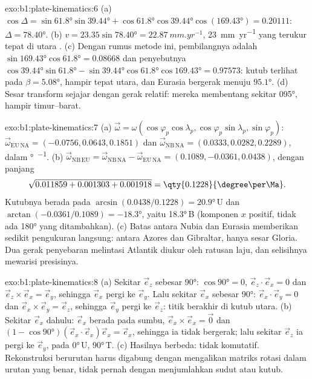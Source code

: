\begin{solution}{exo:b1:plate-kinematics:6}
(a) $\cos\Delta = \sin\ang{61.8}\sin\ang{39.44} + \cos\ang{61.8}\cos\ang{39.44}
\cos(\ang{169.43}) = 0.20111$: $\Delta = \ang{78.40}$. (b) $v = 23.35
\sin\ang{78.40} = \qty{22.87}{mm.yr^{-1}}$, \qty{23}{mm.yr^{-1}} yang terukur
tepat di utara . (c) Dengan rumus metode ini, pembilangnya
adalah $\sin\ang{169.43}\cos\ang{61.8} = 0.08668$ dan penyebutnya
$\cos\ang{39.44}\sin\ang{61.8} - \sin\ang{39.44}\cos\ang{61.8}\cos\ang{169.43}
= 0.97573$: kutub terlihat pada $\beta = \ang{5.08}$, hampir tepat utara, dan
Eurasia bergerak menuju $\ang{95.1}$. (d) Sesar transform sejajar dengan gerak
relatif: mereka membentang sekitar \ang{095}, hampir timur--barat.
\end{solution}

\begin{solution}{exo:b1:plate-kinematics:7}
(a) $\vec\omega = \omega(\cos\varphi_p\cos\lambda_p, \cos\varphi_p\sin\lambda_p,
\sin\varphi_p)$: $\vec\omega_{\mathrm{EU\,NA}} = (-0.0756, 0.0643, 0.1851)$ dan
$\vec\omega_{\mathrm{NB\,NA}} = (0.0333, 0.0282, 0.2289)$, dalam
\unit{\degree\per\Ma}. (b) $\vec\omega_{\mathrm{NB\,EU}} =
\vec\omega_{\mathrm{NB\,NA}} - \vec\omega_{\mathrm{EU\,NA}} = (0.1089, -0.0361,
0.0438)$, dengan panjang
\[
  \sqrt{0.011859 + 0.001303 + 0.001918} = \qty{0.1228}{\degree\per\Ma}.
\]
Kutubnya berada pada 
$\arcsin(0.0438/0.1228) = \ang{20.9}$\,U dan 
$\arctan(-0.0361/0.1089) = \ang{-18.3}$, yaitu \ang{18.3}\,B (komponen $x$
positif, tidak ada \ang{180} yang ditambahkan). (c) Batas antara Nubia dan Eurasia
memberikan sedikit pengukuran langsung: antara Azores dan Gibraltar, hanya  sesar
Gloria. Dua gerak penyebaran melintasi Atlantik diukur oleh ratusan laju, dan selisihnya
mewarisi presisinya.
\end{solution}

\begin{solution}{exo:b1:plate-kinematics:8}
(a) Sekitar $\vec e_z$ sebesar \ang{90}: $\cos\ang{90} = 0$, $\vec e_z\cdot\vec e_x = 0$
dan $\vec e_z\times\vec e_x = \vec e_y$, sehingga $\vec e_x$ pergi ke $\vec e_y$. Lalu
sekitar $\vec e_x$ sebesar \ang{90}: $\vec e_x\cdot\vec e_y = 0$ dan
$\vec e_x\times\vec e_y = \vec e_z$, sehingga $\vec e_y$ pergi ke $\vec e_z$: titik
berakhir di kutub utara. (b) Sekitar $\vec e_x$ dahulu: $\vec e_x$ berada pada sumbu,
$\vec e_x\times\vec e_x = \vec 0$ dan $(1 - \cos\ang{90})(\vec e_x\cdot\vec e_x)
\vec e_x = \vec e_x$, sehingga ia tidak bergerak; lalu sekitar $\vec e_z$ ia pergi ke
$\vec e_y$, pada \ang{0}\,U, \ang{90}\,T. (c) Hasilnya berbeda: 
tidak komutatif. Rekonstruksi berurutan harus digabung dengan mengalikan matriks rotasi dalam urutan yang benar, tidak pernah dengan menjumlahkan sudut
atau kutub.
\end{solution}

